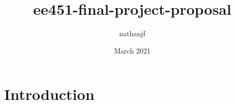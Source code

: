 \documentclass{article}
\title{ee451-final-project-proposal}
\author{nathanjf }
\date{March 2021}
\begin{document}
\maketitle

\section{Introduction}
\end{document}
